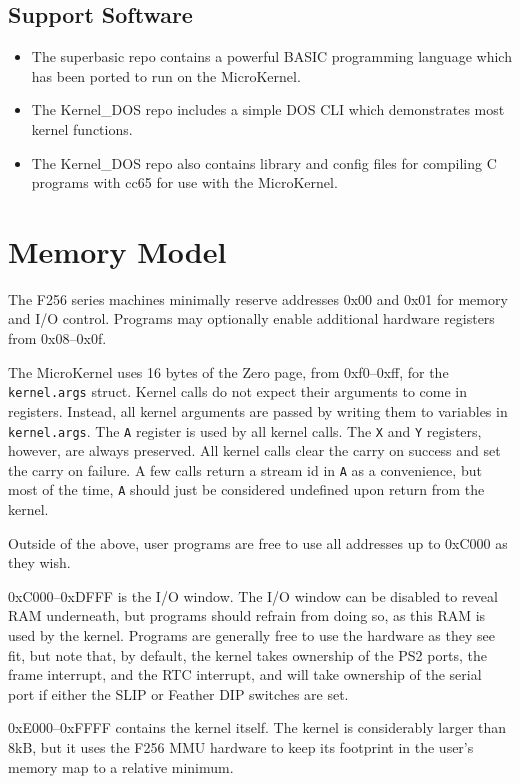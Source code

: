 \subsection*{Support Software}

\begin{itemize}
    \item The superbasic repo contains a powerful BASIC programming language which has been ported to run on the MicroKernel.
    \item The Kernel\_DOS repo includes a simple DOS CLI which demonstrates most kernel functions.
    \item The Kernel\_DOS repo also contains library and config files for compiling C programs with cc65 for use with the MicroKernel.
\end{itemize}

\section*{Memory Model}

The F256 series machines minimally reserve addresses 0x00 and 0x01 for memory and I/O control.  Programs may optionally enable additional hardware registers from 0x08--0x0f.

The MicroKernel uses 16 bytes of the Zero page, from 0xf0--0xff, for the \verb+kernel.args+ struct.  Kernel calls do not expect their arguments to come in registers.  Instead, all kernel arguments are passed by writing them to variables in \verb+kernel.args+.  The \verb+A+ register is used by all kernel calls.  The \verb+X+ and \verb+Y+ registers, however, are always preserved.  All kernel calls clear the carry on success and set the carry on failure.  A few calls return a stream id in \verb+A+ as a convenience, but most of the time, \verb+A+ should just be considered undefined upon return from the kernel.

Outside of the above, user programs are free to use all addresses up to 0xC000 as they wish.

0xC000--0xDFFF is the I/O window.  The I/O window can be disabled to reveal RAM underneath, but programs should refrain from doing so, as this RAM is used by the kernel.  Programs are generally free to use the hardware as they see fit, but note that, by default, the kernel takes ownership of the PS2 ports, the frame interrupt, and the RTC interrupt, and will take ownership of the serial port if either the SLIP or Feather DIP switches are set.

0xE000--0xFFFF contains the kernel itself.  The kernel is considerably larger than 8kB, but it uses the F256 MMU hardware to keep its footprint in the user's memory map to a relative minimum.

